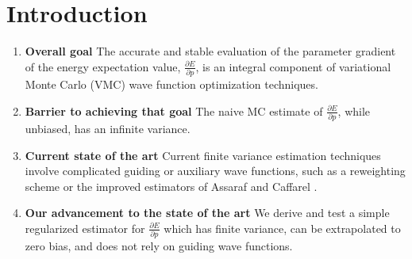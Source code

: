 \documentclass{article}
\begin{document}
\section{Introduction}
\begin{enumerate}
\item \textbf{Overall goal } The accurate and stable evaluation of the parameter gradient of the energy expectation value, $\frac{\partial E}{\partial p}$, is an integral component of variational Monte Carlo (VMC) wave function optimization techniques.

\item \textbf{Barrier to achieving that goal } The naive MC estimate of $\frac{\partial E}{\partial p}$, while unbiased, has an infinite variance.

\item \textbf{Current state of the art} Current finite variance estimation techniques involve complicated guiding or auxiliary wave functions, such as a reweighting scheme \cite{Attaccalite2008, Avella} or the improved estimators of Assaraf and Caffarel \cite{doi:10.1063/1.1286598, Assaraf2003}.

\item \textbf{Our advancement to the state of the art } We derive and test a simple regularized estimator for $\frac{\partial E}{\partial p}$ which has finite variance, can be extrapolated to zero bias, and does not rely on guiding wave functions.
\end{enumerate}
\end{document}

